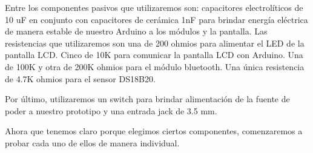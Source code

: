 \par \noindent
Entre los componentes pasivos que utilizaremos son: capacitores electrolíticos de 10 uF en conjunto con capacitores de cerámica 1nF para brindar energía eléctrica de manera estable de nuestro Arduino a los módulos y la pantalla. Las resistencias que utilizaremos son una de 200 ohmios para alimentar el LED de la pantalla LCD. Cinco de 10K para comunicar la pantalla LCD con Arduino. Una de 100K y otra de 200K ohmios para el módulo bluetooth. Una única resistencia de 4.7K ohmios para el sensor DS18B20.

\clearpage

\noindent
Por último, utilizaremos un switch para brindar alimentación de la fuente de poder a nuestro prototipo y una entrada jack de 3.5 mm.

\par \noindent
Ahora que tenemos claro porque elegimos ciertos componentes, comenzaremos a probar cada uno de ellos de manera individual.

